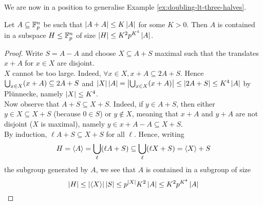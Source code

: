 \documentclass{article}
\begin{document}
We are now in a position to generalise Example \ref{ex:doubling-lt-three-halves}.

\begin{nthm}
  Let $A \subseteq \mathbb F_p^n$ be such that $\left\lvert A + A\right\rvert \le K\left\lvert A\right\rvert$ for some $K > 0$. Then $A$ is contained in a subspace $H \le \mathbb F_p^n$ of size $\left\lvert H\right\rvert \le K^2 p^{K^4} \left\lvert A\right\rvert$.
\end{nthm}
\begin{proof}
  Write $S = A - A$ and choose $X \subseteq A + S$ maximal such that the translates $x + A$ for $x \in X$ are disjoint. \\
  $X$ cannot be too large. Indeed, $\forall x \in X, x + A \subseteq 2A + S$. Hence $\bigcup_{x \in X} (x + A) \subseteq 2A + S$ and $\left\lvert X\right\rvert\left\lvert A\right\rvert = \left\lvert \bigcup_{x \in X} (x + A)\right\rvert \le \left\lvert 2A + S\right\rvert \le K^4\left\lvert A\right\rvert$ by Plünnecke, namely $\left\lvert X\right\rvert \le K^4$. \\
  Now observe that $A + S \subseteq X + S$. Indeed, if $y \in A + S$, then either $y \in X \subseteq X + S$ (because $0 \in S$) or $y \notin X$, meaning that $x + A$ and $y + A$ are not disjoint ($X$ is maximal), namely $y \in x + A - A \subseteq X + S$. \\
  By induction, $\ell A + S \subseteq X + S$ for all $\ell$. Hence, writing
  $$H = \langle A\rangle = \bigcup_\ell (\ell A + S) \subseteq \bigcup_\ell (\ell X + S) = \langle X\rangle + S$$
  the subgroup generated by $A$, we see that $A$ is contained in a subgroup of size
  $$\left\lvert H\right\rvert \le \left\lvert \langle X\rangle\right\rvert\left\lvert S\right\rvert \le p^{\left\lvert X\right\rvert}K^2\left\lvert A\right\rvert \le K^2p^{K^4}\left\lvert A\right\rvert$$
\end{proof}
\end{document}

